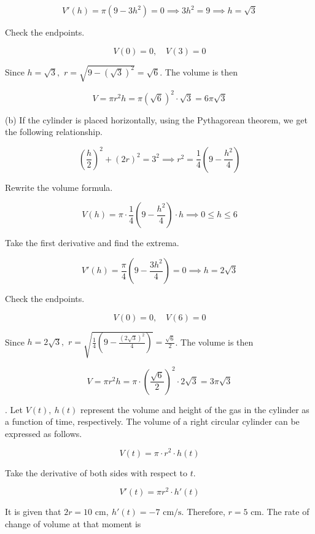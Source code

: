 \documentclass{article}
\begin{document}
\[V'(h)=\pi\left(9-3h^2\right)=0\implies 3h^2=9\implies h=\sqrt3\]

\noindent Check the endpoints.

\[V(0)=0,\quad V(3)=0\]

\hfill

\noindent Since $h=\sqrt3,$ $r=\sqrt{9-\left(\sqrt3\right)^2}=\sqrt6$. The volume is then

\[V=\pi r^2 h=\pi\left(\sqrt6\right)^2\cdot\sqrt3=\boxed{6\pi\sqrt3}\]

\hfill

\noindent (b) If the cylinder is placed horizontally, using the Pythagorean theorem, we get the following relationship.

\[\left(\frac h2\right)^2+\left(2r\right)^2=3^2\implies r^2=\frac14\left(9-\frac{h^2}4\right)\]

\hfill

\noindent Rewrite the volume formula.

\[V(h)=\pi\cdot\frac14\left(9-\frac{h^2}4\right)\cdot h\implies0\leq h\leq6\]

\hfill

\noindent Take the first derivative and find the extrema.

\[V'(h) =\frac\pi4\left(9-\frac{3h^2}4\right)=0\implies h=2\sqrt3\]

\hfill

\noindent Check the endpoints.

\[V(0)=0,\quad V(6)=0\]

\hfill

\noindent Since $h=2\sqrt3,$ $r=\sqrt{\frac14\left(9-\frac{(2\sqrt3)^2}4\right)}=\frac{\sqrt6}2$. The volume is then

\[V=\pi r^2 h=\pi\cdot\left(\frac{\sqrt6}2\right)^2\cdot2\sqrt3=\boxed{3\pi\sqrt3}\]

\hfill

. Let $V(t),\:h(t)$ represent the volume and height of the gas in the cylinder as a function of time, respectively. The volume of a right circular cylinder can be expressed as follows.

\[V(t)=\pi\cdot r^2\cdot h(t)\]

\hfill

\noindent Take the derivative of both sides with respect to $t$.

\[V'(t)=\pi r^2\cdot h'(t)\]

\hfill

\noindent It is given that $2r=10\text{ cm},\: h'(t)=-7\text{ cm/s}$. Therefore, $r=5$ cm. The rate of change of volume at that moment is
\end{document}
